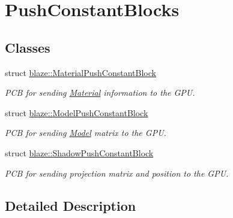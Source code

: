 \hypertarget{group__PushConstantBlocks}{}\section{Push\+Constant\+Blocks}
\label{group__PushConstantBlocks}
\subsection*{Classes}
\begin{DoxyCompactItemize}
\item 
struct \hyperlink{structblaze_1_1MaterialPushConstantBlock}{blaze\+::\+Material\+Push\+Constant\+Block}
\begin{DoxyCompactList}\small\item\em P\+CB for sending \hyperlink{classblaze_1_1Material}{Material} information to the G\+PU. \end{DoxyCompactList}\item 
struct \hyperlink{structblaze_1_1ModelPushConstantBlock}{blaze\+::\+Model\+Push\+Constant\+Block}
\begin{DoxyCompactList}\small\item\em P\+CB for sending \hyperlink{classblaze_1_1Model}{Model} matrix to the G\+PU. \end{DoxyCompactList}\item 
struct \hyperlink{structblaze_1_1ShadowPushConstantBlock}{blaze\+::\+Shadow\+Push\+Constant\+Block}
\begin{DoxyCompactList}\small\item\em P\+CB for sending projection matrix and position to the G\+PU. \end{DoxyCompactList}\end{DoxyCompactItemize}


\subsection{Detailed Description}
